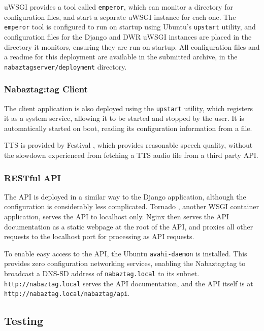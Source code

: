 \documentclass[12pt, a4paper]{article}
\begin{document}
	uWSGI provides a tool called \verb+emperor+, which can monitor a directory for configuration files, and start a separate uWSGI instance for each one. The \verb+emperor+ tool is configured to run on startup using Ubuntu's \verb+upstart+ utility, and configuration files for the Django and \ac{DWR} uWSGI instances are placed in the directory it monitors, ensuring they are run on startup. All configuration files and a readme for this deployment are available in the submitted archive, in the \verb+nabaztagserver/deployment+ directory.
	
	\subsubsection{Nabaztag:tag Client}
	
	The client application is also deployed using the \verb+upstart+ utility, which registers it as a system service, allowing it to be started and stopped by the user. It is automatically started on boot, reading its configuration information from a file.
	
	\ac{TTS} is provided by Festival \parencite{festival}, which provides reasonable speech quality, without the slowdown experienced from fetching a \ac{TTS} audio file from a third party \ac{API}.
	
	\subsubsection{\acs{REST}ful \acs{API}}
	
	The \ac{API} is deployed in a similar way to the Django application, although the configuration is considerably less complicated. Tornado \parencite{tornado}, another \ac{WSGI} container application, serves the \ac{API} to localhost only. Nginx then serves the \ac{API} documentation as a static webpage at the root of the \ac{API}, and proxies all other requests to the localhost port for processing as \ac{API} requests.
	
	To enable easy access to the \ac{API}, the Ubuntu \verb+avahi-daemon+ \parencite{avahi} is installed. This provides zero configuration networking services, enabling the Nabaztag:tag to broadcast a \ac{DNS-SD} address of \verb+nabaztag.local+ to its subnet. \verb+http://nabaztag.local+ serves the \ac{API} documentation, and the \ac{API} itself is at \verb+http://nabaztag.local/nabaztag/api+.
	
	\subsection{Testing}
	
\end{document}
